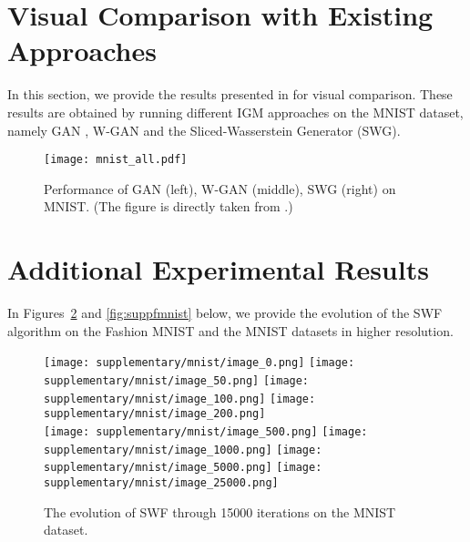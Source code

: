 

\section{Visual Comparison with Existing Approaches}

In this section, we provide the results presented in \cite{deshpande2018generative} for visual comparison. These results are obtained by running different IGM approaches on the MNIST dataset, namely GAN \cite{goodfellow2014generative}, W-GAN \cite{arjovsky2017wasserstein} and the Sliced-Wasserstein Generator (SWG). 

\begin{figure}[h!]
\centering
\texttt{[image: mnist\_all.pdf]}
\caption{Performance of GAN (left), W-GAN (middle), SWG (right) on MNIST. (The figure is directly taken from \cite{deshpande2018generative}.) }
\label{fig:mnistall}
\end{figure}


\section{Additional Experimental Results}

In Figures~\ref{fig:suppmnist} and \ref{fig:suppfmnist} below, we provide the evolution of the SWF algorithm on the Fashion MNIST and the MNIST datasets in higher resolution.

\newcommand{\picwidth}{0.15}%

\begin{figure}
\centering
\texttt{[image: supplementary/mnist/image\_0.png]}
\texttt{[image: supplementary/mnist/image\_50.png]}
\texttt{[image: supplementary/mnist/image\_100.png]}
\texttt{[image: supplementary/mnist/image\_200.png]}\\
\texttt{[image: supplementary/mnist/image\_500.png]}
\texttt{[image: supplementary/mnist/image\_1000.png]}
\texttt{[image: supplementary/mnist/image\_5000.png]}
\texttt{[image: supplementary/mnist/image\_25000.png]}
\caption{The evolution of SWF through 15000 iterations on the MNIST dataset.}
\label{fig:suppmnist}
\end{figure}

